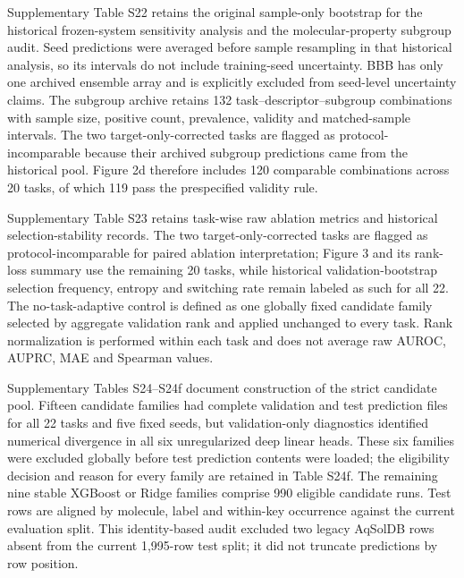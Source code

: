 \documentclass[10pt]{article}
\begin{document}
Supplementary Table S22 retains the original sample-only bootstrap for the historical frozen-system sensitivity analysis and the molecular-property subgroup audit. Seed predictions were averaged before sample resampling in that historical analysis, so its intervals do not include training-seed uncertainty. BBB has only one archived ensemble array and is explicitly excluded from seed-level uncertainty claims. The subgroup archive retains 132 task--descriptor--subgroup combinations with sample size, positive count, prevalence, validity and matched-sample intervals. The two target-only-corrected tasks are flagged as protocol-incomparable because their archived subgroup predictions came from the historical pool. Figure 2d therefore includes 120 comparable combinations across 20 tasks, of which 119 pass the prespecified validity rule.

Supplementary Table S23 retains task-wise raw ablation metrics and historical selection-stability records. The two target-only-corrected tasks are flagged as protocol-incomparable for paired ablation interpretation; Figure 3 and its rank-loss summary use the remaining 20 tasks, while historical validation-bootstrap selection frequency, entropy and switching rate remain labeled as such for all 22. The no-task-adaptive control is defined as one globally fixed candidate family selected by aggregate validation rank and applied unchanged to every task. Rank normalization is performed within each task and does not average raw AUROC, AUPRC, MAE and Spearman values.

Supplementary Tables S24--S24f document construction of the strict candidate pool. Fifteen candidate families had complete validation and test prediction files for all 22 tasks and five fixed seeds, but validation-only diagnostics identified numerical divergence in all six unregularized deep linear heads. These six families were excluded globally before test prediction contents were loaded; the eligibility decision and reason for every family are retained in Table S24f. The remaining nine stable XGBoost or Ridge families comprise 990 eligible candidate runs. Test rows are aligned by molecule, label and within-key occurrence against the current evaluation split. This identity-based audit excluded two legacy AqSolDB rows absent from the current 1,995-row test split; it did not truncate predictions by row position.
\end{document}
